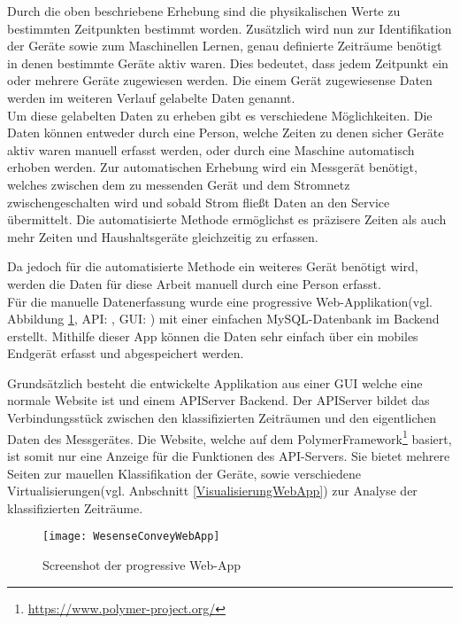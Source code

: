         Durch die oben beschriebene Erhebung sind die physikalischen Werte zu bestimmten Zeitpunkten bestimmt worden.
        Zusätzlich wird nun zur Identifikation der Geräte sowie zum Maschinellen Lernen, genau definierte Zeiträume benötigt in denen bestimmte Geräte aktiv waren.
        Dies bedeutet, dass jedem Zeitpunkt ein oder mehrere Geräte zugewiesen werden. Die einem Gerät zugewiesense Daten werden im weiteren Verlauf gelabelte Daten genannt.\\
        \newline
        Um diese gelabelten Daten zu erheben gibt es verschiedene Möglichkeiten.
        Die Daten können entweder durch eine Person, welche Zeiten zu denen sicher Geräte aktiv waren manuell erfasst werden, oder durch eine Maschine automatisch erhoben werden.
        Zur automatischen Erhebung wird ein Messgerät benötigt, welches zwischen dem zu messenden Gerät und dem Stromnetz zwischengeschalten wird und sobald Strom fließt Daten an den Service übermittelt.
        Die automatisierte Methode ermöglichst es präzisere Zeiten als auch mehr Zeiten und Haushaltsgeräte gleichzeitig zu erfassen.

        Da jedoch für die automatisierte Methode ein weiteres Gerät benötigt wird, werden die Daten für diese Arbeit manuell durch eine Person erfasst.\\
        \newline
        Für die manuelle Datenerfassung wurde eine progressive Web-Applikation(vgl. Abbildung \ref{fig:WebApp1}, API: \cite{WesenseAPIRepo}, GUI: \cite{WesenseGUIRepo}) mit einer einfachen MySQL-Datenbank im Backend erstellt.
        Mithilfe dieser App können die Daten sehr einfach über ein mobiles Endgerät erfasst und abgespeichert werden.
        \newline

        Grundsätzlich besteht die entwickelte Applikation aus einer GUI welche eine normale Website ist und einem API\-Server Backend.
        Der API\-Server bildet das Verbindungsstück zwischen den klassifizierten Zeiträumen und den eigentlichen Daten des Messgerätes.
        Die Website, welche auf dem Polymer\-Framework\footnote{\url{https://www.polymer-project.org/}} basiert, ist somit nur eine Anzeige für die Funktionen des API-Servers.
        Sie bietet mehrere Seiten zur mauellen Klassifikation der Geräte, sowie verschiedene Virtualisierungen(vgl. Anbschnitt \ref{VisualisierungWebApp}) zur Analyse der klassifizierten Zeiträume.

        \begin{figure}[h]
            \centering
            \texttt{[image: WesenseConveyWebApp]}
            \caption{Screenshot der progressive Web-App}
            \label{fig:WebApp1}
        \end{figure}

